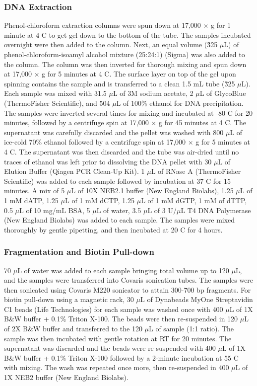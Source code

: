 \subsubsection{DNA Extraction}

Phenol-chloroform extraction columns were spun down at 17,000 $\times$ g for 1 minute at 4 \textdegree C to get gel down to the bottom of the tube.
The samples incubated overnight were then added to the column.
Next, an equal volume (\~325 $\mu$L) of phenol-chloroform-isoamyl alcohol mixture (25:24:1) (Sigma) was also added to the column.
The column was then inverted for thorough mixing and spun down at 17,000 $\times$ g for 5 minutes at 4 \textdegree C.
The surface layer on top of the gel upon spinning contains the sample and is transferred to a clean 1.5 mL tube (\~325 $\mu$L).
Each sample was mixed with 31.5 $\mu$L of 3M sodium acetate, 2 $\mu$L of GlycoBlue (ThermoFisher Scientific), and 504 $\mu$L of 100\% ethanol for DNA precipitation.
The samples were inverted several times for mixing and incubated at -80 \textdegree C for 20 minutes, followed by a centrifuge spin at 17,000 $\times$ g for 45 minutes at 4 \textdegree C.
The supernatant was carefully discarded and the pellet was washed with 800 $\mu$L of ice-cold 70\% ethanol followed by a centrifuge spin at 17,000 $\times$ g for 5 minutes at 4 \textdegree C.
The supernatant was then discarded and the tube was air-dried until no traces of ethanol was left prior to dissolving the DNA pellet with 30 $\mu$L of Elution Buffer (Qiagen PCR Clean-Up Kit).
1 $\mu$L of RNase A (ThermoFisher Scientific) was added to each sample followed by incubation at 37 \textdegree C for 15 minutes.
A mix of 5 $\mu$L of 10X NEB2.1 buffer (New England Biolabs), 1.25 $\mu$L of 1 mM dATP, 1.25 $\mu$L of 1 mM dCTP, 1.25 $\mu$L of 1 mM dGTP, 1 mM of dTTP, 0.5 $\mu$L of 10 mg/mL BSA, 5 $\mu$L of water, 3.5 $\mu$L of 3 U/$\mu$L T4 DNA Polymerase (New England Biolabs) was added to each sample.
The samples were mixed thoroughly by gentle pipetting, and then incubated at 20 \textdegree C for 4 hours.

\subsubsection{Fragmentation and Biotin Pull-down}

70 $\mu$L of water was added to each sample bringing total volume up to 120 $\mu$L, and the samples were transferred into Covaris sonication tubes.
The samples were then sonicated using Covaris M220 sonicator to attain 300-700 bp fragments.
For biotin pull-down using a magnetic rack, 30 $\mu$L of Dynabeads MyOne Streptavidin C1 beads (Life Technologies) for each sample was washed once with 400 $\mu$L of 1X B\&W buffer + 0.1\% Triton X-100.
The beads were then re-suspended in 120 $\mu$L of 2X B\&W buffer and transferred to the 120 $\mu$L of sample (1:1 ratio).
The sample was then incubated with gentle rotation at RT for 20 minutes.
The supernatant was discarded and the beads were re-suspended with 400 $\mu$L of 1X B\&W buffer + 0.1\% Triton X-100 followed by a 2-minute incubation at 55 \textdegree C with mixing.
The wash was repeated once more, then re-suspended in 400 $\mu$L of 1X NEB2 buffer (New England Biolabs).

